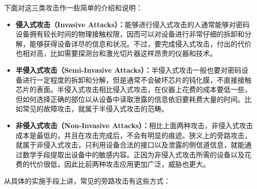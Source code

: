 \vspace*{\baselineskip}

下面对这三类攻击作一些简单的介绍和说明： \cite{paa_cn}

\begin{itemize}
\item \textbf{侵入式攻击（Invasive Attacks）：}能够进行侵入式攻击的人通常能够对密码设备拥有较长时间的物理接触权限，因而可以对设备进行非常仔细的拆卸和分解，能够获得设备详尽的信息和状况。不过，要完成侵入式攻击，付出的代价也相对高，比如需要探测台和激光切片器这样昂贵的仪器和技术。

\item \textbf{半侵入式攻击（Semi-Invasive Attacks）：}半侵入式攻击一般也要对密码设备进行一定程度的拆卸和分解，但是通常不会破坏芯片的钝化膜，不直接接触芯片的表面。半侵入式攻击相比侵入式攻击，在仪器上花费的成本要低一些，但如何选择正确的部位以从设备中读取泄露的信息依旧要耗费大量的时间。比如常见的故障攻击，就属于半侵入式攻击的范畴。

\item \textbf{非侵入式攻击（Non-Invasive Attacks）：}相比上面两种攻击，非侵入式攻击成本是最低的，并且在攻击完成后，不会有明显的痕迹。狭义上的旁路攻击，就属于非侵入式攻击，只利用设备合法的接口以及泄露的侧信道信息，就能通过数学手段提取出设备中的敏感内容。正因为非侵入式攻击所需的设备以及花费的代价很低，因此比前两种攻击应用更加广泛，威胁也更大。
\end{itemize}

\vspace*{\baselineskip}

从具体的实施手段上讲，常见的旁路攻击有这些方式：

